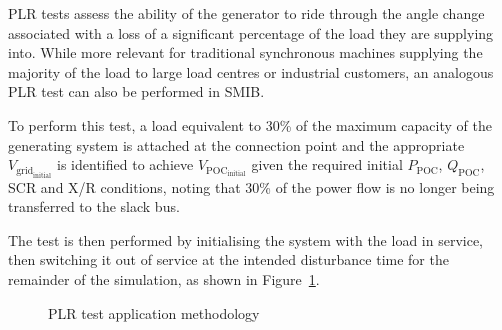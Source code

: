 \ac{PLR} tests assess the ability of the generator to ride through the angle change associated with a loss of a significant percentage of the load they are supplying into. While more relevant for traditional synchronous machines supplying the majority of the load to large load centres or industrial customers, an analogous \ac{PLR} test can also be performed in SMIB.

To perform this test, a load equivalent to 30\% of the maximum capacity of the generating system is attached at the connection point and the appropriate $V_{\mathrm{grid}_{\mathrm{initial}}}$ is  identified to achieve $V_{\mathrm{POC}_{\mathrm{initial}}}$ given the required initial $P_{\mathrm{POC}}$, $Q_{\mathrm{POC}}$, SCR and X/R conditions, noting that 30\% of the power flow is no longer being transferred to the slack bus. 

The test is then performed by initialising the system with the load in service, then switching it out of service at the intended disturbance time for the remainder of the simulation, as shown in Figure~\ref{fig:smib-plr-diagram}.


\begin{figure}[h]
	\centering
	
	\caption{PLR test application methodology}
	\label{fig:smib-plr-diagram}
\end{figure}